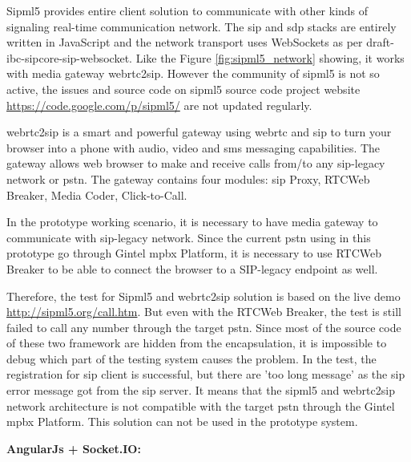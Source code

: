 \par Sipml5 provides entire client solution to communicate with other kinds of signaling real-time communication network. The \gls{sip} and \gls{sdp} stacks are entirely written in JavaScript and the network transport uses WebSockets as per draft-ibc-sipcore-sip-websocket. Like the Figure \ref{fig:sipml5_network} showing, it works with media gateway webrtc2sip. However the community of sipml5 is not so active, the issues and source code on sipml5 source code project website \url{https://code.google.com/p/sipml5/} are not updated regularly.

\par webrtc2sip is a smart and powerful gateway using \gls{webrtc} and \gls{sip} to turn your browser into a phone with audio, video and \gls{sms} messaging capabilities. The gateway allows web browser to make and receive calls from/to any \gls{sip}-legacy network or \gls{pstn}. The gateway contains four modules: \gls{sip} Proxy, RTCWeb Breaker, Media Coder, Click-to-Call.\cite{website:webrtc2sip}

\par In the prototype working scenario, it is necessary to have media gateway to communicate with \gls{sip}-legacy network. Since the current \gls{pstn} using in this prototype go through Gintel \gls{mpbx} Platform, it is necessary to use RTCWeb Breaker to be able to connect the browser to a SIP-legacy endpoint as well.

\par Therefore, the test for Sipml5 and webrtc2sip solution is based on the live demo \url{http://sipml5.org/call.htm}. But even with the RTCWeb Breaker, the test is still failed to call any number through the target \gls{pstn}. Since most of the source code of these two framework are hidden from the encapsulation, it is impossible to debug which part of the testing system causes the problem. In the test, the registration for \gls{sip} client is successful, but there are 'too long message' as the \gls{sip} error message got from the \gls{sip} server. It means that the sipml5 and webrtc2sip network architecture is not compatible with the target \gls{pstn} through the Gintel \gls{mpbx} Platform. This solution can not be used in the prototype system.

\textbf{AngularJs + Socket.IO:}

